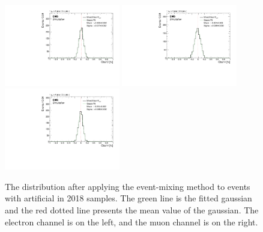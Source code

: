 \begin{figure}
    \includegraphics[width=0.45\textwidth]{figure/SimAcp_18_mu_Obs12_Acp_10_mixed.pdf}
    \includegraphics[width=0.45\textwidth]{figure/SimAcp_18_el_Obs14_Acp_10_mixed.pdf}
    \includegraphics[width=0.45\textwidth]{figure/SimAcp_18_mu_Obs14_Acp_10_mixed.pdf}
    \caption[The \Acpprime distribution after applying the event-mixing method to \ttbar events in 2018 samples.]
    {
        The \Acpprime distribution after applying the event-mixing method to \ttbar events with artificial \Acpprime in 2018 samples. 
        The green line is the fitted gaussian and the red dotted line presents the mean value of the gaussian.
        The electron channel is on the left, and the muon channel is on the right.
    }
    \label{fig:18_exchanging_simulation_acp}
\end{figure}

